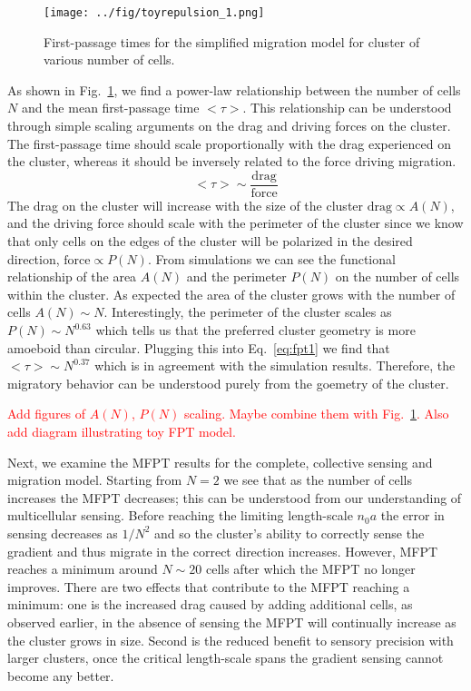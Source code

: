 \documentclass[a4paper]{article}
\renewcommand{\r}[1]{\textcolor{red}{#1}}
\begin{document}
\begin{figure}
    \centering
        \texttt{[image: ../fig/toyrepulsion\_1.png]}
    \caption{First-passage times for the simplified migration model for cluster of various number of cells.} \label{fig:toyFPT}
\end{figure}

As shown in Fig.\ \ref{fig:toyFPT}, we find a power-law relationship between the number of cells $N$ and the mean first-passage time $<\tau>$. This relationship can be understood through simple scaling arguments on the drag and driving forces on the cluster. The first-passage time should scale proportionally with the drag experienced on the cluster, whereas it should be inversely related to the force driving migration.
\begin{equation} \label{eq:fpt1}
    <\tau> \sim \frac{\text{drag}}{\text{force}}
\end{equation}
The drag on the cluster will increase with the size of the cluster $\text{drag} \propto A(N)$, and the driving force should scale with the perimeter of the cluster since we know that only cells on the edges of the cluster will be polarized in the desired direction, $\text{force} \propto P(N)$. From simulations we can see the functional relationship of the area $A(N)$ and the perimeter $P(N)$ on the number of cells within the cluster. As expected the area of the cluster grows with the number of cells $A(N) \sim N$. Interestingly, the perimeter of the cluster scales as $P(N) \sim N^{0.63}$ which tells us that the preferred cluster geometry is more amoeboid than circular. Plugging this into Eq.\ \ref{eq:fpt1} we find that $<\tau >\sim N^{0.37}$ which is in agreement with the simulation results. Therefore, the migratory behavior can be understood purely from the goemetry of the cluster.

\r{Add figures of $A(N)$, $P(N)$ scaling. Maybe combine them with Fig.\ \ref{fig:toyFPT}. Also add diagram illustrating toy FPT model.}

Next, we examine the MFPT results for the complete, collective sensing and migration model. Starting from $N=2$ we see that as the number of cells increases the MFPT decreases; this can be understood from our understanding of multicellular sensing. Before reaching the limiting length-scale $n_0a$ the error in sensing decreases as $1/N^2$ and so the cluster's ability to correctly sense the gradient and thus migrate in the correct direction increases. However, MFPT reaches a minimum around $N \sim 20$ cells after which the MFPT no longer improves. There are two effects that contribute to the MFPT reaching a minimum: one is the increased drag caused by adding additional cells, as observed earlier, in the absence of sensing the MFPT will continually increase as the cluster grows in size. Second is the reduced benefit to sensory precision with larger clusters, once the critical length-scale spans the gradient sensing cannot become any better.
\end{document}
